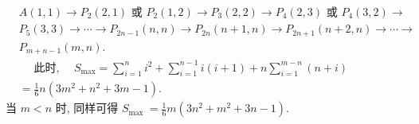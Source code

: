 $$
\begin{aligned}
& A(1,1) \rightarrow P_2(2,1) \text { 或 } P_2(1,2) \rightarrow P_3(2,2) \rightarrow P_4(2,3) \text { 或 } P_4(3,2) \rightarrow \\
& P_5(3,3) \rightarrow \cdots \rightarrow P_{2 n-1}(n, n) \rightarrow P_{2 n}(n+1, n) \rightarrow P_{2 n+1}(n+2, n) \rightarrow \cdots \rightarrow \\
& P_{m+n-1}(m, n) . \\
& \quad \text { 此时, } \quad S_{\max }=\sum_{i=1}^n i^2+\sum_{i=1}^{n-1} i(i+1)+n \sum_{i=1}^{m-n}(n+i) \\
& =\frac{1}{6} n\left(3 m^2+n^2+3 m-1\right) .
\end{aligned}
$$
当 $m<n$ 时, 同样可得 $S_{\text {max }}=\frac{1}{6} m\left(3 n^2+m^2+3 n-1\right)$.



